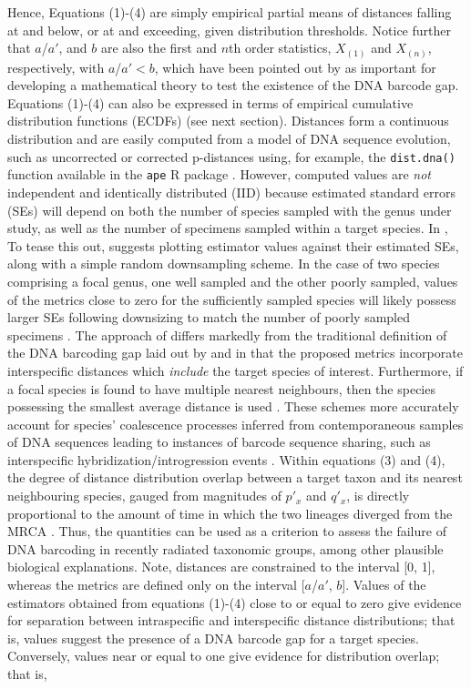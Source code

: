 \documentclass[12pt]{article}
\begin{document}
\noindent Hence, Equations (1)-(4) are simply empirical partial means of distances falling at and below, or at and exceeding, given distribution thresholds. Notice further that $a$/$a'$, and $b$ are also the first and $n$th order statistics, $X_{(1)}$ and $X_{(n)}$, respectively, with  $a$/$a' < b$,  which have been pointed out by \citet{phillips2022lack} as important for developing a mathematical theory to test the existence of the DNA barcode gap. Equations (1)-(4) can also be expressed in terms of empirical cumulative distribution functions (ECDFs) (see next section). Distances form a continuous distribution and are easily computed from a model of DNA sequence evolution, such as uncorrected or corrected p-distances \citep{jukes1969evolution, kimura1980simple} using, for example, the {\tt dist.dna()} function available in the {\tt ape} R package \citep{paradis2004ape}. However, computed values are \textit{not} independent and identically distributed (IID) because estimated standard errors (SEs) will depend on both the number of species sampled with the genus under study, as well as the number of specimens sampled within a target species. In \citet{phillips2024measure}, To tease this out, \citet{phillips2024measure} suggests plotting estimator values against their estimated SEs, along with a simple random downsampling scheme. In the case of two species comprising a focal genus, one well sampled and the other poorly sampled, values of the metrics close to zero for the sufficiently sampled species will likely possess larger SEs following downsizing to match the number of poorly sampled specimens \citep{phillips2024measure}. The approach of \citet{phillips2024measure} differs markedly from the traditional definition of the DNA barcoding gap laid out by \citet{meyer2005dna} and \citet{meier2008use} in that the proposed metrics incorporate interspecific distances which \textit{include} the target species of interest. Furthermore, if a focal species is found to have multiple nearest neighbours, then the species possessing the smallest average distance is used \citep{phillips2024measure}. These schemes more accurately account for species' coalescence processes inferred from contemporaneous samples of DNA sequences leading to instances of barcode sequence sharing, such as interspecific hybridization/introgression events \citep{phillips2024measure}. Within equations (3) and (4), the degree of distance distribution overlap between a target taxon and its nearest neighbouring species, gauged from magnitudes of $p'_x$ and $q'_x$, is directly proportional to the amount of time in which the two lineages diverged from the MRCA \citep{phillips2024measure}. Thus, the quantities can be used as a criterion to assess the failure of DNA barcoding in recently radiated taxonomic groups, among other plausible biological explanations.  Note, distances are constrained to the interval [0, 1], whereas the metrics are defined only on the interval [$a$/$a'$, $b$]. Values of the estimators obtained from equations (1)-(4) close to or equal to zero give evidence for separation between intraspecific and interspecific distance distributions; that is, values suggest the presence of a DNA barcode gap for a target species. Conversely, values near or equal to one give evidence for distribution overlap; that is, 
\end{document}
